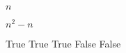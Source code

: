 \documentclass[11pt,largemargins]{homework}
\begin{document}

\newpage
\question

$n$

\newpage
\question

$n^2 - n$

\newpage
\question

\begin{alphaparts}
  \questionpart
    True
  \questionpart
    True
  \questionpart
    True
  \questionpart
    False
  \questionpart
    False
\end{alphaparts}
\end{document}
